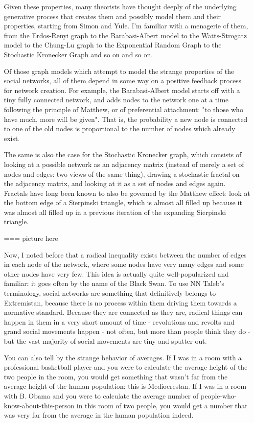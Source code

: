 \documentclass[12pt]{article}
\begin{document}
Given these properties, many theorists have thought deeply of the underlying generative process that creates them and possibly model them and their properties, starting from Simon and Yule. I'm familiar with a menagerie of them, from the Erdos-Renyi graph to the Barabasi-Albert model to the Watts-Strogatz model to the Chung-Lu graph to the Exponential Random Graph to the Stochastic Kronecker Graph and so on and so on.

Of those graph models which attempt to model the strange properties of the social networks, all of them depend in some way on a positive feedback process for network creation. For example, the Barabasi-Albert model starts off with a tiny fully connected network, and adds nodes to the network one at a time following the principle of Matthew, or of preferential attachment: "to those who have much, more will be given". That is, the probability a new node is connected to one of the old nodes is proportional to the number of nodes which already exist. 

The same is also the case for the Stochastic Kronecker graph, which consists of looking at a possible network as an adjacency matrix (instead of merely a set of nodes and edges: two views of the same thing), drawing a stochastic fractal on the adjacency matrix, and looking at it as a set of nodes and edges again. Fractals have long been known to also be governed by the Matthew effect: look at the bottom edge of a Sierpinski triangle, which is almost all filled up because it was almost all filled up in a previous iteration of the expanding Sierpinski triangle.

=== picture here

Now, I noted before that a radical inequality exists between the number of edges in each node of the network, where some nodes have very many edges and some other nodes have very few. This idea is actually quite well-popularized and familiar: it goes often by the name of the Black Swan. To use NN Taleb's terminology, social networks are something that definitively belongs to Extremistan, because there is no process within them driving them towards a normative standard. Because they are connected as they are, radical things can happen in them in a very short amount of time - revolutions and revolts and grand social movements happen - not often, but more than people think they do - but the vast majority of social movements are tiny and sputter out.

You can also tell by the strange behavior of averages. If I was in a room with a professional basketball player and you were to calculate the average height of the two people in the room, you would get something that wasn't far from the average height of the human population: this is Mediocrestan. If I was in a room with B. Obama and you were to calculate the average number of people-who-know-about-this-person in this room of two people, you would get a number that was very far from the average in the human population indeed.
\end{document}
